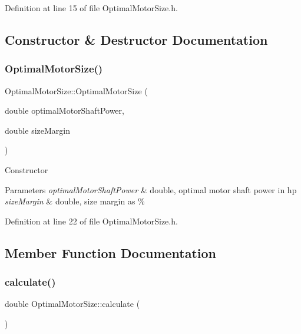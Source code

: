 Definition at line 15 of file Optimal\+Motor\+Size.\+h.



\subsection{Constructor \& Destructor Documentation}
\mbox{\label{class_optimal_motor_size_ad051dd00b8879fc4232536c936e98be1}} 
\subsubsection{\texorpdfstring{Optimal\+Motor\+Size()}{OptimalMotorSize()}}
{\footnotesize\ttfamily Optimal\+Motor\+Size\+::\+Optimal\+Motor\+Size (\begin{DoxyParamCaption}\item[{double}]{optimal\+Motor\+Shaft\+Power,  }\item[{double}]{size\+Margin }\end{DoxyParamCaption})\hspace{0.3cm}{\ttfamily [inline]}}

Constructor 
\begin{DoxyParams}{Parameters}
{\em optimal\+Motor\+Shaft\+Power} & double, optimal motor shaft power in hp \\
\hline
{\em size\+Margin} & double, size margin as \% \\
\hline
\end{DoxyParams}


Definition at line 22 of file Optimal\+Motor\+Size.\+h.



\subsection{Member Function Documentation}
\mbox{\label{class_optimal_motor_size_aa9f4e68b9e1807d20e7738cd0789a539}} 
\subsubsection{\texorpdfstring{calculate()}{calculate()}}
{\footnotesize\ttfamily double Optimal\+Motor\+Size\+::calculate (\begin{DoxyParamCaption}{ }\end{DoxyParamCaption})}



